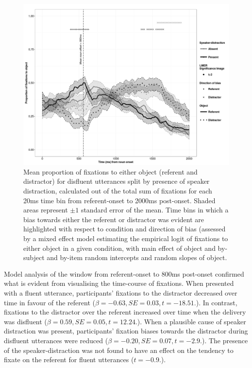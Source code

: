\documentclass[a4paper,man,natbib]{apa6}
\begin{document}
\begin{figure}[Ht] %
  \centering
	\includegraphics[scale=.5]{disfluent.png}
  \caption{Mean proportion of fixations to either object (referent and distractor) for disfluent utterances split by presence of speaker distraction, calculated out of the total sum of fixations for each 20ms time bin from referent-onset to 2000ms post-onset. Shaded areas represent $\pm 1$ standard error of the mean. Time bins in which a bias towards either the referent or distractor was evident are highlighted with respect to condition and direction of bias (assessed by a mixed effect model estimating the empirical logit of fixations to either object in a given condition, with main effect of object and by-subject and by-item random intercepts and random slopes of object.}
  \label{fig:diseye}
\end{figure}


Model analysis of the window from referent-onset to 800ms post-onset confirmed what is evident from visualising the time-course of fixations. 
When presented with a fluent utterance, participants' fixations to the distractor decreased over time in favour of the referent ($\beta = -0.63, SE = 0.03, t=-18.51.$). 
In contrast, fixations to the distractor over the referent increased over time when the delivery was disfluent ($\beta = 0.59, SE = 0.05, t=12.24.$). 
When a plausible cause of speaker distraction was present, participants' fixation biases towards the distractor during disfluent utterances were reduced ($\beta = -0.20, SE = 0.07, t=-2.9.$). 
The presence of the speaker-distraction was not found to have an effect on the tendency to fixate on the referent for fluent utterances ($t=-0.9.$).\\
\end{document}
